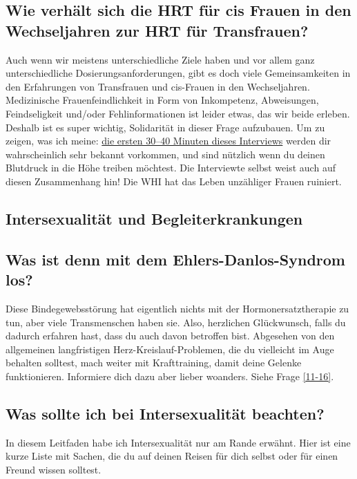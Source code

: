 \documentclass{article}
\begin{document}
{{{\subsection{Wie verhält sich die HRT für cis Frauen in den Wechseljahren zur HRT für Transfrauen?}\label{11-29}

Auch wenn wir meistens unterschiedliche Ziele haben und vor allem ganz unterschiedliche Dosierungsanforderungen, gibt es doch viele Gemeinsamkeiten in den Erfahrungen von Transfrauen und cis-Frauen in den Wechseljahren. Medizinische Frauenfeindlichkeit in Form von Inkompetenz, Abweisungen, Feindseligkeit und/oder Fehlinformationen ist leider etwas, das wir beide erleben. Deshalb ist es super wichtig, Solidarität in dieser Frage aufzubauen. Um zu zeigen, was ich meine: \href{https://www.youtube.com/watch?v=W0XW6av2wLQ}{die ersten 30–40 Minuten dieses Interviews} werden dir wahrscheinlich sehr bekannt vorkommen, und sind nützlich wenn du deinen Blutdruck in die Höhe treiben möchtest. Die Interviewte selbst weist auch auf diesen Zusammenhang hin! Die WHI hat das Leben unzähliger Frauen ruiniert.


\subsection*{Intersexualität und Begleiterkrankungen}

\subsection{Was ist denn mit dem Ehlers-Danlos-Syndrom los?}

Diese Bindegewebsstörung hat eigentlich nichts mit der Hormonersatztherapie zu tun, aber viele Transmenschen haben sie. Also, herzlichen Glückwunsch, falls du dadurch erfahren hast, dass du auch davon betroffen bist. Abgesehen von den allgemeinen langfristigen Herz-Kreislauf-Problemen, die du vielleicht im Auge behalten solltest, mach weiter mit Krafttraining, damit deine Gelenke funktionieren. Informiere dich dazu aber lieber woanders. Siehe Frage \ref{11-16}.

\subsection{Was sollte ich bei Intersexualität beachten?}

In diesem Leitfaden habe ich Intersexualität nur am Rande erwähnt. Hier ist eine kurze Liste mit Sachen, die du auf deinen Reisen für dich selbst oder für einen Freund wissen solltest.

}}}
\end{document}
